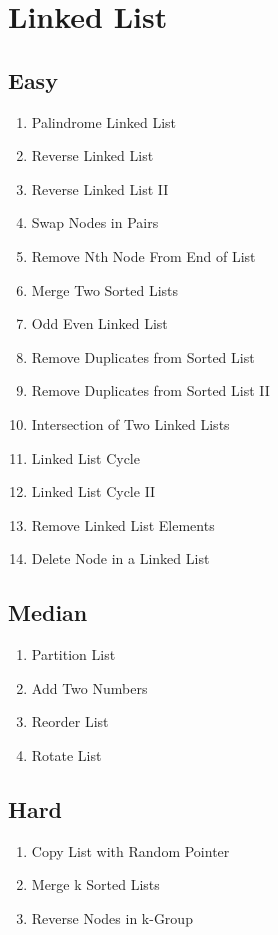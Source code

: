 \documentclass[DIV=calc, paper=a4, fontsize=11pt, twocolumn]{scrartcl}	 %
\begin{document}
\section*{Linked List}

\subsection*{Easy}
\begin{enumerate}
\item Palindrome Linked List \cite{234} 
\item Reverse Linked List \cite{206}
\item Reverse Linked List II \cite{092}
\item Swap Nodes in Pairs \cite{024}
\item Remove Nth Node From End of List \cite{019}
\item Merge Two Sorted Lists \cite{021}
\item Odd Even Linked List \cite{328}
\item Remove Duplicates from Sorted List \cite{083}
\item Remove Duplicates from Sorted List II \cite{082}
\item Intersection of Two Linked Lists \cite{160}
\item Linked List Cycle \cite{141}
\item Linked List Cycle II \cite{142}
\item Remove Linked List Elements \cite{203}
\item Delete Node in a Linked List \cite{237}
\end{enumerate}
\subsection*{Median}
\begin{enumerate}
\item Partition List \cite{086}
\item Add Two Numbers \cite{002}
\item Reorder List \cite{143}  
\item Rotate List \cite{061}
\end{enumerate}
\subsection*{Hard}
\begin{enumerate}
\item Copy List with Random Pointer \cite{138}
\item Merge k Sorted Lists   \cite{023}
\item Reverse Nodes in k-Group \cite{025}
\end{enumerate}
\end{document}
